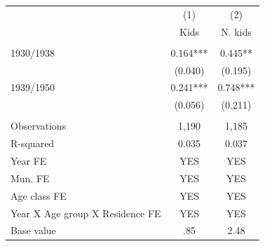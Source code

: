 \begin{tabular}{lcc} \hline
 & (1) & (2) \\
 & Kids & N. kids \\ \hline
 &  &  \\
1930/1938 & 0.164*** & 0.445** \\
 & (0.040) & (0.195) \\
1939/1950 & 0.241*** & 0.748*** \\
 & (0.056) & (0.211) \\
 &  &  \\
Observations & 1,190 & 1,185 \\
R-squared & 0.035 & 0.037 \\
Year FE & YES & YES \\
Mun. FE & YES & YES \\
Age class FE & YES & YES \\
Year X Age group X Residence FE & YES & YES \\
 Base value & .85 & 2.48 \\ \hline
\end{tabular}
